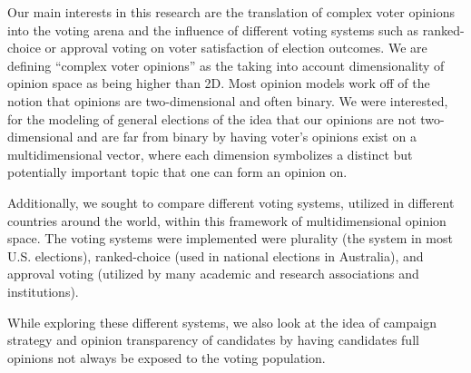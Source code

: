 Our main interests in this research are the translation of complex voter opinions into the voting arena and the influence of different voting systems such as ranked-choice or approval voting on voter satisfaction of election outcomes.
We are defining ``complex voter opinions'' as the taking into account dimensionality of opinion space as being higher than 2D.
Most opinion models work off of the notion that opinions are two-dimensional and often binary.
We were interested, for the modeling of general elections of the idea that our opinions are not two-dimensional and are far from binary by having voter's opinions exist on a multidimensional vector, where each dimension symbolizes a distinct but potentially important topic that one can form an opinion on.

Additionally, we sought to compare different voting systems, utilized in different countries around the world, within this framework of multidimensional opinion space.
The voting systems were implemented were plurality (the system in most U.S. elections), ranked-choice (used in national elections in Australia), and approval voting (utilized by many academic and research associations and institutions).

While exploring these different systems, we also look at the idea of campaign strategy and opinion transparency of candidates by having candidates full opinions not always be exposed to the voting population.

\\
\\


\cite{hoyer1974comparing}

